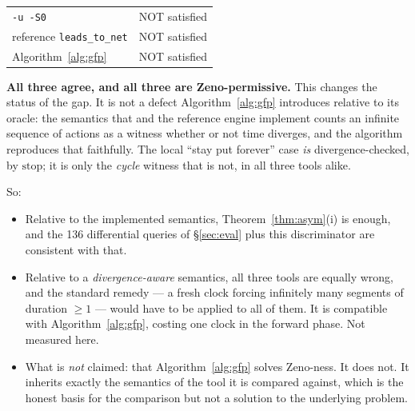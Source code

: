 \begin{center}\small
\begin{tabular}{ll}
\toprule
\verifyta{} \texttt{-u -S0} & NOT satisfied \\
reference \texttt{leads\_to\_net} & NOT satisfied \\
Algorithm~\ref{alg:gfp} & NOT satisfied \\
\bottomrule
\end{tabular}
\end{center}
\measured{}

\textbf{All three agree, and all three are Zeno-permissive.} This changes the status of the gap. It
is not a defect Algorithm~\ref{alg:gfp} introduces relative to its oracle: the semantics that
\uppaal{} and the reference engine implement counts an infinite sequence of actions as a witness
whether or not time diverges, and the algorithm reproduces that faithfully. The local
``stay put forever'' case \emph{is} divergence-checked, by $\mathrm{stop}$; it is only the
\emph{cycle} witness that is not, in all three tools alike.

So:

\begin{itemize}
  \item Relative to the implemented semantics, Theorem~\ref{thm:asym}(i) is enough, and the 136
        differential queries of \S\ref{sec:eval} plus this discriminator are consistent with that.
        \measured{}
  \item Relative to a \emph{divergence-aware} semantics, all three tools are equally wrong, and the
        standard remedy --- a fresh clock forcing infinitely many segments of duration $\ge 1$ ---
        would have to be applied to all of them. It is compatible with Algorithm~\ref{alg:gfp},
        costing one clock in the forward phase. Not measured here. \openq{}
  \item What is \emph{not} claimed: that Algorithm~\ref{alg:gfp} solves Zeno-ness. It does not. It
        inherits exactly the semantics of the tool it is compared against, which is the honest
        basis for the comparison but not a solution to the underlying problem.
\end{itemize}
